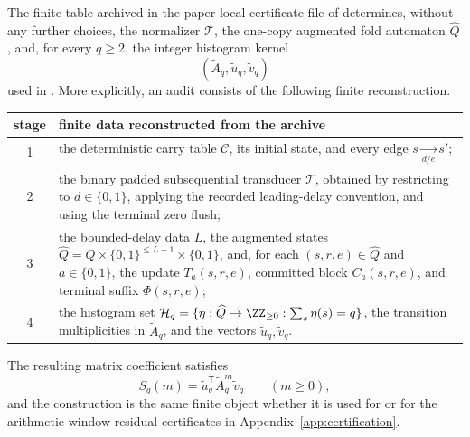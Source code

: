 \begin{proposition}
\label{prop:auditable-kernel-reconstruction}
The finite table archived in the paper-local certificate file of
 determines, without any further
choices, the normalizer \(\mathcal T\), the one-copy augmented fold automaton
\(\widehat Q\), and, for every \(q\ge2\), the integer histogram kernel
\[
  (\widetilde A_q,\widetilde u_q,\widetilde v_q)
\]
used in .  More
explicitly, an audit consists of the following finite reconstruction.
\begin{center}
\small
\begin{tabular}{@{}cp{}@{}}
\toprule
stage & finite data reconstructed from the archive\\
\midrule
1 & the deterministic carry table \(\mathcal C\), its initial state, and every
edge \(s\xrightarrow[d/e]{}s'\);\\
2 & the binary padded subsequential transducer \(\mathcal T\), obtained by
restricting to \(d\in\{0,1\}\), applying the recorded leading-delay convention,
and using the terminal zero flush;\\
3 & the bounded-delay data \(L\), the augmented states
\(\widehat Q=Q\times\{0,1\}^{\le L+1}\times\{0,1\}\), and, for each
\((s,r,e)\in\widehat Q\) and \(a\in\{0,1\}\), the update
\(T_a(s,r,e)\), committed block \(C_a(s,r,e)\), and terminal suffix
\(\Phi(s,r,e)\);\\
4 & the histogram set
\(\mathcal H_q=\{\eta:\widehat Q\to\ZZ_{\ge0}:\sum_s\eta(s)=q\}\), the
transition multiplicities in \(\widetilde A_q\), and the vectors
\(\widetilde u_q,\widetilde v_q\).\\
\bottomrule
\end{tabular}
\end{center}
The resulting matrix coefficient satisfies
\[
  S_q(m)=\widetilde u_q^{\mathsf T}\widetilde A_q^m\widetilde v_q
  \qquad(m\ge0),
\]
and the construction is the same finite object whether it is used for
 or for the
arithmetic-window residual certificates in Appendix~\ref{app:certification}.
\end{proposition}


